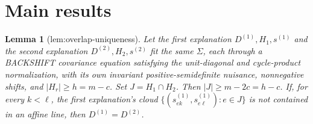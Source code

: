 \documentclass{article}
\newtheorem{lemma}{Lemma}
\begin{document}
\section{Main results}

\begin{lemma}[lem:overlap-uniqueness]\label{lem:overlap-uniqueness}
Let the first explanation \(D^{(1)},H_1,s^{(1)}\) and the second explanation \(D^{(2)},H_2,s^{(2)}\) fit the same \(\Sigma\), each through a BACKSHIFT covariance equation satisfying the unit-diagonal and cycle-product normalization, with its own invariant positive-semidefinite nuisance, nonnegative shifts, and \(|H_r|\ge h=m-c\). Set \(J=H_1\cap H_2\). Then \(|J|\ge m-2c=h-c\). If, for every \(k<\ell\), the first explanation's cloud \(\{(s^{(1)}_{ek},s^{(1)}_{e\ell}):e\in J\}\) is not contained in an affine line, then \(D^{(1)}=D^{(2)}\).
\end{lemma}
\end{document}
